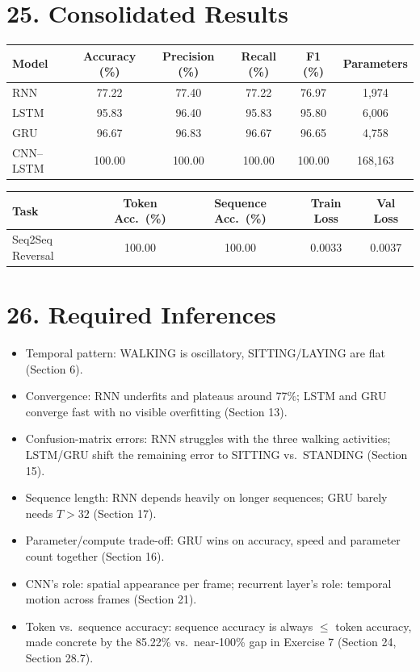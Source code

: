\documentclass[10pt]{article}
\begin{document}
\section*{25. Consolidated Results}

\begin{center}
\begin{tabular}{|l|c|c|c|c|c|}
\hline
Model & Accuracy (\%) & Precision (\%) & Recall (\%) & F1 (\%) & Parameters\\
\hline
RNN & 77.22 & 77.40 & 77.22 & 76.97 & 1,974\\
LSTM & 95.83 & 96.40 & 95.83 & 95.80 & 6,006\\
GRU & 96.67 & 96.83 & 96.67 & 96.65 & 4,758\\
CNN--LSTM & 100.00 & 100.00 & 100.00 & 100.00 & 168,163\\
\hline
\end{tabular}
\end{center}

\begin{center}
\begin{tabular}{|l|c|c|c|c|}
\hline
Task & Token Acc.\ (\%) & Sequence Acc.\ (\%) & Train Loss & Val Loss\\
\hline
Seq2Seq Reversal & 100.00 & 100.00 & 0.0033 & 0.0037\\
\hline
\end{tabular}
\end{center}

\section*{26. Required Inferences}

\begin{itemize}
\item Temporal pattern: WALKING is oscillatory, SITTING/LAYING are flat (Section 6).
\item Convergence: RNN underfits and plateaus around 77\%; LSTM and GRU converge fast with no visible overfitting (Section 13).
\item Confusion-matrix errors: RNN struggles with the three walking activities; LSTM/GRU shift the remaining error to SITTING vs.\ STANDING (Section 15).
\item Sequence length: RNN depends heavily on longer sequences; GRU barely needs $T>32$ (Section 17).
\item Parameter/compute trade-off: GRU wins on accuracy, speed and parameter count together (Section 16).
\item CNN's role: spatial appearance per frame; recurrent layer's role: temporal motion across frames (Section 21).
\item Token vs.\ sequence accuracy: sequence accuracy is always $\le$ token accuracy, made concrete by the 85.22\% vs.\ near-100\% gap in Exercise 7 (Section 24, Section 28.7).
\end{itemize}
\end{document}
